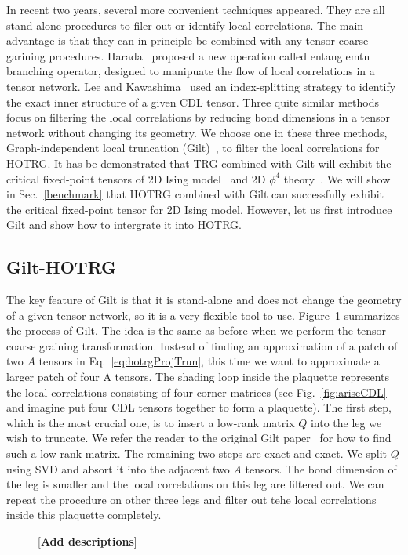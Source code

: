 \documentclass[aps,prb,reprint,superscriptaddress]{revtex4-2}
\begin{document}
In recent two years, several more convenient techniques appeared. They are
all stand-alone procedures to filer out or identify local correlations.
The main advantage is that they can in principle be combined with any
tensor coarse garining procedures. Harada~\cite{harada2018} proposed a
new operation called entanglemtn branching operator, designed to
manipuate the flow of local correlations in a tensor network. Lee and
Kawashima~\cite{tensor-ring} used an index-splitting strategy to
identify the exact inner structure of a given CDL tensor. Three quite
similar methods~\cite{tns,gilts,fet} focus on filtering the local
correlations by reducing bond dimensions in a tensor network without
changing its geometry. We choose one in these three methods,
Graph-independent local truncation (Gilt)~\cite{gilts}, to filter the local
correlations for HOTRG. It has be demonstrated that TRG combined with
Gilt will exhibit the critical fixed-point tensors of 2D Ising
model~\cite{gilts} and 2D $\phi^4$ theory~\cite{Delcamp2020}. We will
show in Sec.~\ref{benchmark} that HOTRG combined with Gilt can
successfully exhibit the critical fixed-point tensor for 2D Ising model.
However, let us first introduce Gilt and show how to intergrate it into
HOTRG.
%

\subsection{Gilt-HOTRG\label{gilt-hotrg}}
The key feature of Gilt is that it is stand-alone and does
not change the geometry of a given tensor network, so it is a very
flexible tool to use. Figure~\ref{fig:gilt} summarizes the process of
Gilt. The idea is the same as before when we perform the tensor coarse
graining transformation. Instead of finding an approximation of a patch
of two $A$ tensors in Eq.~\eqref{eq:hotrgProjTrun}, this time we want to
approximate a larger patch of four A tensors. The shading loop inside
the plaquette represents the local correlations consisting of four
corner matrices (see Fig.~\ref{fig:ariseCDL} and imagine put four CDL
tensors together to form a plaquette). The first step, which is the
most crucial one, is to insert a low-rank matrix $Q$ into the leg we
wish to truncate. We refer the reader to the original Gilt
paper~\cite{gilts} for how to find such a low-rank matrix. The remaining
two steps are exact and exact. We split $Q$ using SVD and absort it into
the adjacent two $A$ tensors. The bond dimension of the leg is smaller
and the local correlations on this leg are filtered out. We can repeat
the procedure on other three legs and filter out tehe local correlations
inside this plaquette completely.
%
\begin{figure}[h]
    \caption{\label{fig:gilt}[\textbf{Add descriptions}]}
\end{figure}
%
\end{document}
